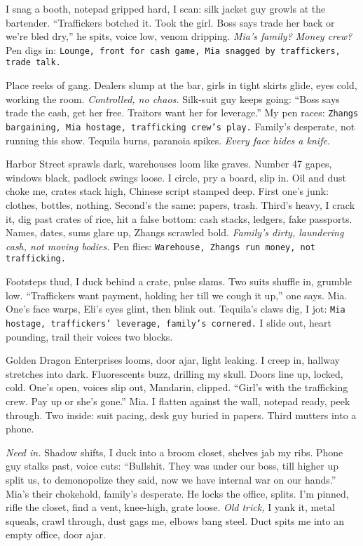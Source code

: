 \documentclass[12pt]{article}
\newcommand{\note}[1]{\texttt{#1}}
\begin{document}
{I snag a booth, notepad gripped hard, I scan: silk jacket guy growls at the bartender. “Traffickers botched it. Took the girl. Boss says trade her back or we’re bled dry,” he spits, voice low, venom dripping. \textit{Mia’s family? Money crew?} Pen digs in: \note{Lounge, front for cash game, Mia snagged by traffickers, trade talk.}

Place reeks of gang. Dealers slump at the bar, girls in tight skirts glide, eyes cold, working the room. \textit{Controlled, no chaos.} Silk-suit guy keeps going: “Boss says trade the cash, get her free. Traitors want her for leverage.” My pen races: \note{Zhangs bargaining, Mia hostage, trafficking crew’s play.} Family’s desperate, not running this show. Tequila burns, paranoia spikes. \textit{Every face hides a knife.}

Harbor Street sprawls dark, warehouses loom like graves. Number 47 gapes, windows black, padlock swings loose. I circle, pry a board, slip in. Oil and dust choke me, crates stack high, Chinese script stamped deep. First one’s junk: clothes, bottles, nothing. Second’s the same: papers, trash. Third’s heavy, I crack it, dig past crates of rice, hit a false bottom: cash stacks, ledgers, fake passports. Names, dates, sums glare up, Zhangs scrawled bold. \textit{Family’s dirty, laundering cash, not moving bodies.} Pen flies: \note{Warehouse, Zhangs run money, not trafficking.}

Footsteps thud, I duck behind a crate, pulse slams. Two suits shuffle in, grumble low. “Traffickers want payment, holding her till we cough it up,” one says. \textnormal{Mia}. One’s face warps, \textnormal{Eli}’s eyes glint, then blink out. Tequila’s claws dig, I jot: \note{Mia hostage, traffickers’ leverage, family’s cornered.} I slide out, heart pounding, trail their voices two blocks.

Golden Dragon Enterprises looms, door ajar, light leaking. I creep in, hallway stretches into dark. Fluorescents buzz, drilling my skull. Doors line up, locked, cold. One’s open, voices slip out, Mandarin, clipped. “Girl’s with the trafficking crew. Pay up or she’s gone.” \textnormal{Mia}. I flatten against the wall, notepad ready, peek through. Two inside: suit pacing, desk guy buried in papers. Third mutters into a phone.

\textit{Need in.} Shadow shifts, I duck into a broom closet, shelves jab my ribs. Phone guy stalks past, voice cuts: “Bullshit. They was under our boss, till higher up split us, to demonopolize they said, now we have internal war on our hands.” \textnormal{Mia}’s their chokehold, family’s desperate. He locks the office, splits. I’m pinned, rifle the closet, find a vent, knee-high, grate loose. \textit{Old trick,} I yank it, metal squeals, crawl through, dust gags me, elbows bang steel. Duct spits me into an empty office, door ajar.

}
\end{document}
